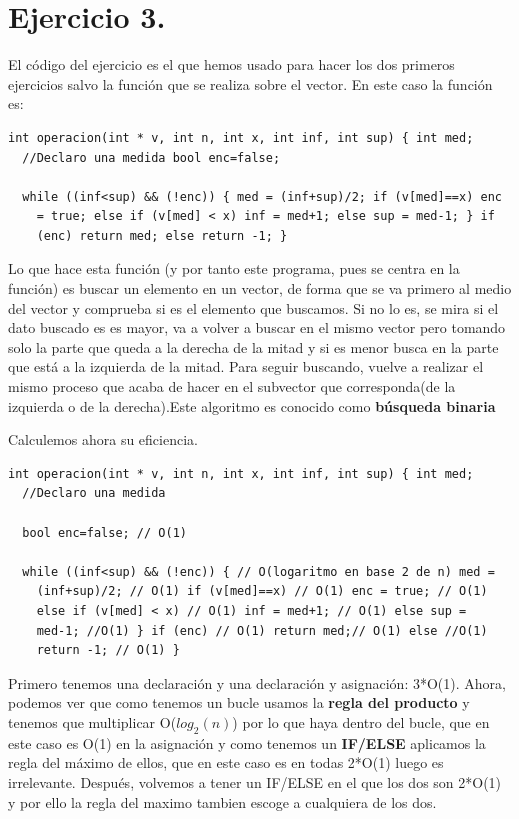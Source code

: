 \documentclass[11pt]{article}
\begin{document}
\section*{Ejercicio 3.}
\label{sec-3}

El código del ejercicio es el que hemos usado para hacer los dos
primeros ejercicios salvo la función que se realiza sobre el
vector. En este caso la función es:

\begin{verbatim}
int operacion(int * v, int n, int x, int inf, int sup) { int med;
  //Declaro una medida bool enc=false;

  while ((inf<sup) && (!enc)) { med = (inf+sup)/2; if (v[med]==x) enc
    = true; else if (v[med] < x) inf = med+1; else sup = med-1; } if
    (enc) return med; else return -1; }
\end{verbatim}

Lo que hace esta función (y por tanto este programa, pues se centra en
la función) es buscar un elemento en un vector, de forma que se va
primero al medio del vector y comprueba si es el elemento que
buscamos. Si no lo es, se mira si el dato buscado es es mayor, va a
volver a buscar en el mismo vector pero tomando solo la parte que
queda a la derecha de la mitad y si es menor busca en la parte que
está a la izquierda de la mitad. Para seguir buscando, vuelve a
realizar el mismo proceso que acaba de hacer en el subvector que
corresponda(de la izquierda o de la derecha).Este algoritmo es
conocido como \textbf{\textbf{búsqueda binaria}}

Calculemos ahora su eficiencia.

\begin{verbatim}
int operacion(int * v, int n, int x, int inf, int sup) { int med;
  //Declaro una medida

  bool enc=false; // O(1)

  while ((inf<sup) && (!enc)) { // O(logaritmo en base 2 de n) med =
    (inf+sup)/2; // O(1) if (v[med]==x) // O(1) enc = true; // O(1)
    else if (v[med] < x) // O(1) inf = med+1; // O(1) else sup =
    med-1; //O(1) } if (enc) // O(1) return med;// O(1) else //O(1)
    return -1; // O(1) }
\end{verbatim}

Primero tenemos una declaración y una declaración y asignación:
3*O(1).  Ahora, podemos ver que como tenemos un bucle usamos la \textbf{regla
del producto} y tenemos que multiplicar O($log_2 (n)$) por lo que haya
dentro del bucle, que en este caso es O(1) en la asignación y como
tenemos un \textbf{\textbf{IF/ELSE}} aplicamos la regla del máximo de ellos, que en
este caso es en todas 2*O(1) luego es irrelevante.  Después, volvemos
a tener un IF/ELSE en el que los dos son 2*O(1) y por ello la regla
del maximo tambien escoge a cualquiera de los dos.
\end{document}
